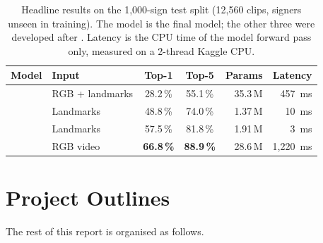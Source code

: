 \begin{table}[htbp]
\centering
\caption{Headline results on the 1,000-sign \aslc{} test split (12,560
clips, signers unseen in training). The \rthreed{} model is the final
\capB{} model; the other three were developed after \capB{}. Latency is the CPU time of
the model forward pass only, measured on a 2-thread Kaggle CPU.}
\label{tab:headline}
\small
\setlength{\tabcolsep}{4pt}
\begin{tabular}{@{}l l c c r r@{}}
\toprule
\rowcolor{tablehead}
\textbf{Model} & \textbf{Input} & \textbf{Top-1} &
\textbf{Top-5} & \textbf{Params} & \textbf{Latency} \\
\midrule
\rthreed{}   & RGB + landmarks & 28.2\,\% & 55.1\,\% & 35.3\,M & 457~ms \\
\stgcn{}     & Landmarks       & 48.8\,\% & 74.0\,\% & 1.37\,M & 10~ms \\
\geotr{}     & Landmarks       & 57.5\,\% & 81.8\,\% & 1.91\,M & 3~ms \\
\swin{}      & RGB video       & \textbf{66.8\,\%} & \textbf{88.9\,\%} & 28.6\,M & 1,220~ms \\
\bottomrule
\end{tabular}
\end{table}

\section{Project Outlines}
\label{sec:outline}

The rest of this report is organised as follows.

